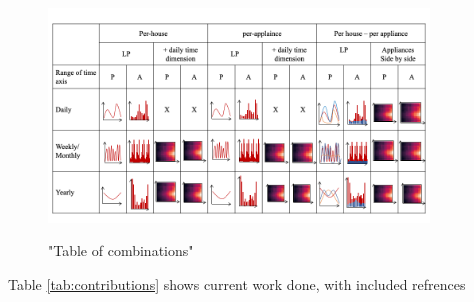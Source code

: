 \begin{figure}[H]
	\centering
	\caption{"Table of combinations"}
	\includegraphics[width=0.9\textwidth]{Figures/profile_sketches/Slide14.png}
	\label{fig:map_fig}
\end{figure}

Table \ref{tab:contributions} shows current work done, with included refrences

